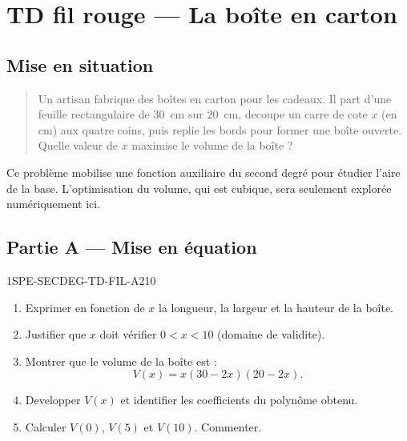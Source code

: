 

\section*{TD fil rouge — La boîte en carton}

\subsection*{Mise en situation}

\begin{quotation}
Un artisan fabrique des boîtes en carton pour les cadeaux. Il part d'une feuille rectangulaire de $30$~cm sur $20$~cm, decoupe un carre de cote $x$ (en cm) aux quatre coins, puis replie les bords pour former une boîte ouverte. Quelle valeur de $x$ maximise le volume de la boîte ?
\end{quotation}

Ce problème mobilise une fonction auxiliaire du second degré pour étudier
l'aire de la base. L'optimisation du volume, qui est cubique, sera seulement
explorée numériquement ici.

\bigskip

\subsection*{Partie A — Mise en équation}

\begin{exercice}{1SPE-SECDEG-TD-FIL-A}{2}{10}
\begin{enumerate}
  \item Exprimer en fonction de $x$ la longueur, la largeur et la hauteur de la boîte.
  \item Justifier que $x$ doit vérifier $0 < x < 10$ (domaine de validite).
  \item Montrer que le volume de la boîte est :
  \[
    V(x) = x(30 - 2x)(20 - 2x).
  \]
  \item Developper $V(x)$ et identifier les coefficients du polynôme obtenu.
  \item Calculer $V(0)$, $V(5)$ et $V(10)$. Commenter.
\end{enumerate}
\end{exercice}

